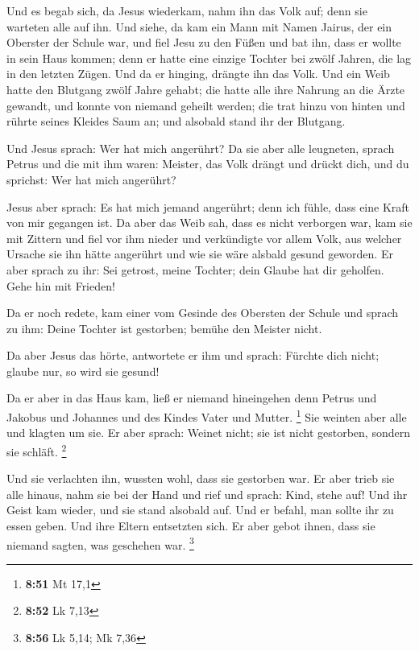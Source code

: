  Und es begab sich, da Jesus wiederkam, nahm ihn das Volk
auf; denn sie warteten alle auf ihn.  Und siehe, da kam
ein Mann mit Namen Jairus, der ein Oberster der Schule war, und fiel
Jesu zu den Füßen und bat ihn, dass er wollte in sein Haus kommen;
 denn er hatte eine einzige Tochter bei zwölf Jahren, die
lag in den letzten Zügen. Und da er hinging, drängte ihn das Volk.
 Und ein Weib hatte den Blutgang zwölf Jahre gehabt; die
hatte alle ihre Nahrung an die Ärzte gewandt, und konnte von niemand
geheilt werden;  die trat hinzu von hinten und rührte
seines Kleides Saum an; und alsobald stand ihr der Blutgang.

 Und Jesus sprach: Wer hat mich angerührt? Da sie aber
alle leugneten, sprach Petrus und die mit ihm waren: Meister, das Volk
drängt und drückt dich, und du sprichst: Wer hat mich angerührt?

 Jesus aber sprach: Es hat mich jemand angerührt; denn
ich fühle, dass eine Kraft von mir gegangen ist.  Da aber
das Weib sah, dass es nicht verborgen war, kam sie mit Zittern und fiel
vor ihm nieder und verkündigte vor allem Volk, aus welcher Ursache sie
ihn hätte angerührt und wie sie wäre alsbald gesund geworden.
 Er aber sprach zu ihr: Sei getrost, meine Tochter; dein
Glaube hat dir geholfen. Gehe hin mit Frieden!

 Da er noch redete, kam einer vom Gesinde des Obersten
der Schule und sprach zu ihm: Deine Tochter ist gestorben; bemühe den
Meister nicht.

 Da aber Jesus das hörte, antwortete er ihm und sprach:
Fürchte dich nicht; glaube nur, so wird sie gesund!

 Da er aber in das Haus kam, ließ er niemand hineingehen
denn Petrus und Jakobus und Johannes und des Kindes Vater und Mutter.
\footnote{\textbf{8:51} Mt 17,1}  Sie weinten aber alle
und klagten um sie. Er aber sprach: Weinet nicht; sie ist nicht
gestorben, sondern sie schläft. \footnote{\textbf{8:52} Lk 7,13}

 Und sie verlachten ihn, wussten wohl, dass sie gestorben
war.  Er aber trieb sie alle hinaus, nahm sie bei der
Hand und rief und sprach: Kind, stehe auf!  Und ihr Geist
kam wieder, und sie stand alsobald auf. Und er befahl, man sollte ihr zu
essen geben.  Und ihre Eltern entsetzten sich. Er aber
gebot ihnen, dass sie niemand sagten, was geschehen war. \footnote{\textbf{8:56}
  Lk 5,14; Mk 7,36}

